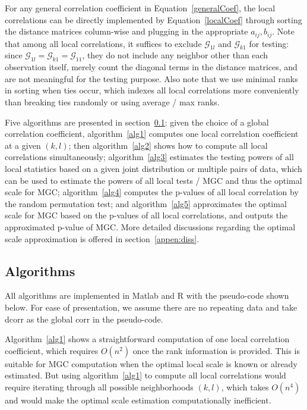 \documentclass[11pt]{article}
\newcommand{\G}{\mathcal{G}}
\begin{document}
For any general correlation coefficient in Equation~\ref{generalCoef}, the local correlations can be directly implemented by Equation~\ref{localCoef} through sorting the distance matrices column-wise and plugging in the appropriate $a_{ij}, b_{ij}$. Note that among all local correlations, it suffices to exclude $\G_{1l}$ and $\G_{k1}$ for testing: since $\G_{1l}=\G_{k1}=\G_{11}$, they do not include any neighbor other than each observation itself, merely count the diagonal terms in the distance matrices, and are not meaningful for the testing purpose. Also note that we use minimal ranks in sorting when ties occur, which indexes all local correlations more conveniently than breaking ties randomly or using average / max ranks.

Five algorithms are presented in section~\ref{appen:algorithms}: given the choice of a global correlation coefficient, algorithm~\ref{alg1} computes one local correlation coefficient at a given $(k,l)$; then algorithm~\ref{alg2} shows how to compute all local correlations simultaneously; algorithm~\ref{alg3} estimates the testing powers of all local statistics based on a given joint distribution or multiple pairs of data, which can be used to estimate the powers of all local tests / MGC and thus the optimal scale for MGC; algorithm~\ref{alg4} computes the p-values of all local correlation by the random permutation test; and algorithm~\ref{alg5} approximates the optimal scale for MGC based on the p-values of all local correlations, and outputs the approximated p-value of MGC. More detailed discussions regarding the optimal scale approximation is offered in section~\ref{appen:diss}.

\subsection{Algorithms}
\label{appen:algorithms}
All algorithms are implemented in Matlab and R with the pseudo-code shown below. For ease of presentation, we assume there are no repeating data and take dcorr as the global corr in the pseudo-code.

Algorithm~\ref{alg1} shows a straightforward computation of one local correlation coefficient, which requires $O(n^2)$ once the rank information is provided. This is suitable for MGC computation when the optimal local scale is known or already estimated. But using algorithm~\ref{alg1} to compute all local correlations would require iterating through all possible neighborhoods $(k,l)$, which takes $O(n^4)$ and would make the optimal scale estimation computationally inefficient. 
\end{document}
